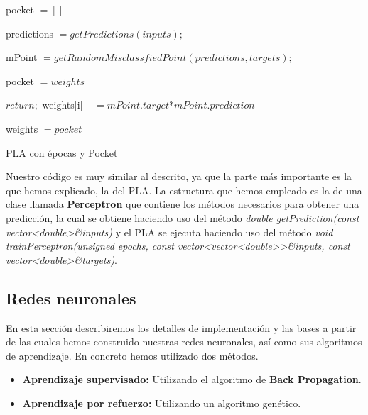 \newpage
\begin{algorithm}[H]
    pocket $= []$
    
    {
        predictions $= getPredictions(inputs);$
        
        mPoint $= getRandomMisclassfiedPoint(predictions, targets);$
        
        {
            pocket $= weights$
        }
        
        {
    		$return;$
    	}
    	{
            {
                weights[i] $+= mPoint.target$*$mPoint.prediction$
            }
    	}
	}
	
	{
	    weights $= pocket$
	}
	\caption{PLA con épocas y Pocket}
	\label{alg:plawithepochsandpocket}
\end{algorithm}
\vspace{2mm}

Nuestro código es muy similar al descrito, ya que la parte más importante es la que hemos explicado, la del PLA. La estructura que hemos empleado es la de una clase llamada \textbf{Perceptron} que contiene los métodos necesarios para obtener una predicción, la cual se obtiene haciendo uso del método \textit{double getPrediction(const vector\textless double\textgreater \&inputs)} y el PLA se ejecuta haciendo uso del método \textit{void trainPerceptron(unsigned epochs, const vector\textless vector\textless double\textgreater \textgreater \&inputs, const vector\textless double\textgreater \&targets)}.

\newpage
\subsection{Redes neuronales}
\label{subsec:nn}

En esta sección describiremos los detalles de implementación y las bases a partir de las cuales hemos construido nuestras redes neuronales, así como sus algoritmos de aprendizaje. En concreto hemos utilizado dos métodos.

\begin{itemize}
    \item \textbf{Aprendizaje supervisado:} Utilizando el algoritmo de \textbf{Back Propagation}.
    \item \textbf{Aprendizaje por refuerzo:} Utilizando un algoritmo genético.
\end{itemize}

